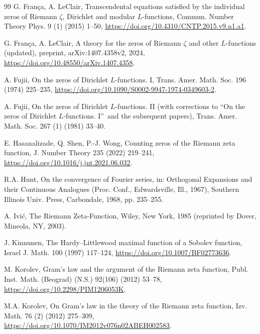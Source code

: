 \documentclass[preprint,12pt]{elsarticle}
\numberwithin{equation}{section}
\theoremstyle{plain}
\theoremstyle{definition}
\theoremstyle{remark}
\begin{document}
\begin{thebibliography}{99}
G. Fran\c{c}a, A. LeClair, Transcendental equations satisfied by the individual zeros of Riemann $\zeta$, Dirichlet and modular $L$-functions, Commun. Number Theory Phys. 9 (1) (2015) 1--50, \href{https://doi.org/10.4310/CNTP.2015.v9.n1.a1}{https://doi.org/10.4310/CNTP.2015.v9.n1.a1}.

G. Fran\c{c}a, A. LeClair, A theory for the zeros of Riemann $\zeta$ and other $L$-functions (updated), preprint, arXiv:1407.4358v2, 2024, \href{https://doi.org/10.48550/arXiv.1407.4358}{https://doi.org/10.48550/arXiv.1407.4358}.

A. Fujii, On the zeros of Dirichlet $L$-functions. I, Trans. Amer. Math. Soc. 196 (1974) 225--235, \href{https://doi.org/10.1090/S0002-9947-1974-0349603-2}{https://doi.org/10.1090/S0002-9947-1974-0349603-2}.

A. Fujii, On the zeros of Dirichlet $L$-functions. II (with corrections to ``On the zeros of Dirichlet $L$-functions. I\textquotedblright\ and the subsequent papers), Trans. Amer. Math. Soc. 267 (1) (1981) 33--40. %

E. Hasanalizade, Q. Shen, P.-J. Wong, Counting zeros of the Riemann zeta function, J. Number Theory 235 (2022) 219--241, \href{https://doi.org/10.1016/j.jnt.2021.06.032}{https://doi.org/10.1016/j.jnt.2021.06.032}.

R.A. Hunt, On the convergence of Fourier series, in: Orthogonal Expansions and their Continuous Analogues (Proc. Conf., Edwardsville, Ill., 1967), Southern Illinois Univ. Press, Carbondale, 1968, pp. 235--255.

A. Ivi\'c, The Riemann Zeta-Function, Wiley, New York, 1985 (reprinted by Dover, Mineola, NY, 2003).

J. Kinnunen, The Hardy--Littlewood maximal function of a Sobolev function, Israel J. Math. 100 (1997) 117--124, \href{https://doi.org/10.1007/BF02773636}{https://doi.org/10.1007/BF02773636}.

M. Korolev, Gram's law and the argument of the Riemann zeta function, Publ. Inst. Math. (Beograd) (N.S.) 92(106) (2012) 53--78, \href{https://doi.org/10.2298/PIM1206053K}{https://doi.org/10.2298/PIM1206053K}.

M.A. Korolev, On Gram's law in the theory of the Riemann zeta function, Izv. Math. 76 (2) (2012) 275--309, \href{https://doi.org/10.1070/IM2012v076n02ABEH002583}{https://doi.org/10.1070/IM2012v076n02ABEH002583}.


\end{thebibliography}
\end{document}
